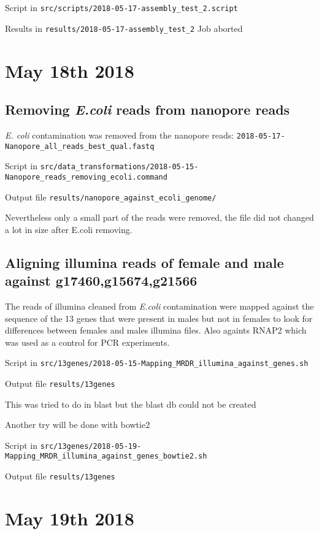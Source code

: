 \documentclass[10pt,a4paper]{article}
\begin{document}
Script in  \verb!src/scripts/2018-05-17-assembly_test_2.script!

Results in  \verb!results/2018-05-17-assembly_test_2!
Job aborted

\section{May 18th 2018}

\subsection{Removing \textit{E.coli} reads from nanopore reads}

\textit{E. coli} contamination was removed from the nanopore reads:
\verb!2018-05-17-Nanopore_all_reads_best_qual.fastq!

Script in  \verb!src/data_transformations/2018-05-15-Nanopore_reads_removing_ecoli.command!

Output file \verb!results/nanopore_against_ecoli_genome/!

Nevertheless only a small part of the reads were removed, the file did not changed a lot in size after E.coli removing.

\subsection{Aligning illumina reads of female and male against g17460,g15674,g21566}

The reads of illumina cleaned from \textit{E.coli} contamination were mapped against the sequence of the 13 genes that were present in males but not in females to look for differences between females and males illumina files. Also againts RNAP2 which was used as a control for PCR experiments.

Script in  \verb!src/13genes/2018-05-15-Mapping_MRDR_illumina_against_genes.sh!

Output file \verb!results/13genes!

This was tried to do in blast but the blast db could not be created

Another try will be done with bowtie2

Script in  \verb!src/13genes/2018-05-19-Mapping_MRDR_illumina_against_genes_bowtie2.sh!

Output file \verb!results/13genes!

\section{May 19th 2018}
\end{document}
